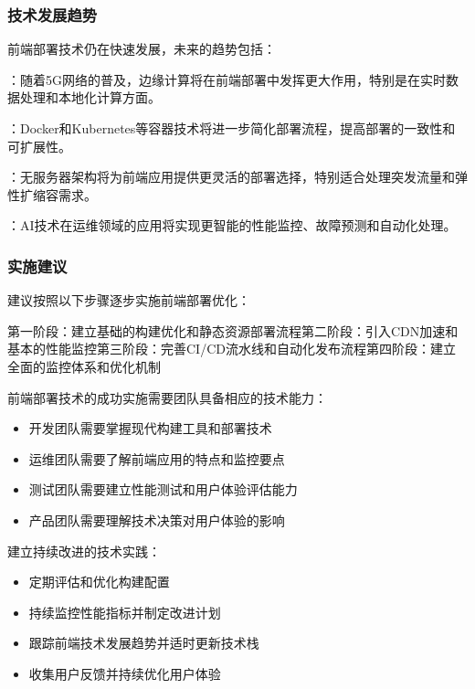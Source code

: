 \hypertarget{ux6280ux672fux53d1ux5c55ux8d8bux52bf}{%
\subsubsection{技术发展趋势}\label{ux6280ux672fux53d1ux5c55ux8d8bux52bf}}

前端部署技术仍在快速发展，未来的趋势包括：

：随着5G网络的普及，边缘计算将在前端部署中发挥更大作用，特别是在实时数据处理和本地化计算方面。

：Docker和Kubernetes等容器技术将进一步简化部署流程，提高部署的一致性和可扩展性。

：无服务器架构将为前端应用提供更灵活的部署选择，特别适合处理突发流量和弹性扩缩容需求。

：AI技术在运维领域的应用将实现更智能的性能监控、故障预测和自动化处理。

\hypertarget{ux5b9eux65bdux5efaux8bae}{%
\subsubsection{实施建议}\label{ux5b9eux65bdux5efaux8bae}}


建议按照以下步骤逐步实施前端部署优化：

第一阶段：建立基础的构建优化和静态资源部署流程第二阶段：引入CDN加速和基本的性能监控第三阶段：完善CI/CD流水线和自动化发布流程第四阶段：建立全面的监控体系和优化机制


前端部署技术的成功实施需要团队具备相应的技术能力：

\begin{itemize}
\tightlist
\item
  开发团队需要掌握现代构建工具和部署技术
\item
  运维团队需要了解前端应用的特点和监控要点
\item
  测试团队需要建立性能测试和用户体验评估能力
\item
  产品团队需要理解技术决策对用户体验的影响
\end{itemize}


建立持续改进的技术实践：

\begin{itemize}
\tightlist
\item
  定期评估和优化构建配置
\item
  持续监控性能指标并制定改进计划
\item
  跟踪前端技术发展趋势并适时更新技术栈
\item
  收集用户反馈并持续优化用户体验
\end{itemize}

